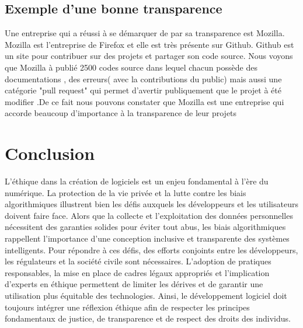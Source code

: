 \documentclass{article}
\begin{document}
\subsection{Exemple d'une bonne transparence}
Une entreprise qui a réussi à se démarquer de par sa transparence est Mozilla. Mozilla est l’entreprise de Firefox et elle est très présente sur Github. Github est un site pour contribuer sur des projets et  partager son code source. Nous voyons que Mozilla à publié 2500 codes source dans lequel chacun possède des documentations  , des erreurs( avec la contributions du public) mais aussi une catégorie "pull request" qui permet d’avertir publiquement que le projet à été modifier  .De ce fait nous pouvons constater que Mozilla est une entreprise qui accorde beaucoup d'importance à la transparence de leur projets 

\section{Conclusion}
L’éthique dans la création de logiciels est un enjeu fondamental à l’ère du numérique. La protection de la vie privée et la lutte contre les biais algorithmiques illustrent bien les défis auxquels les développeurs et les utilisateurs doivent faire face. Alors que la collecte et l’exploitation des données personnelles nécessitent des garanties solides pour éviter tout abus, les biais algorithmiques rappellent l’importance d’une conception inclusive et transparente des systèmes intelligents.
Pour répondre à ces défis, des efforts conjoints entre les développeurs, les régulateurs et la société civile sont nécessaires. L’adoption de pratiques responsables, la mise en place de cadres légaux appropriés et l’implication d’experts en éthique permettent de limiter les dérives et de garantir une utilisation plus équitable des technologies. Ainsi, le développement logiciel doit toujours intégrer une réflexion éthique afin de respecter les principes fondamentaux de justice, de transparence et de respect des droits des individus.



\end{document}

